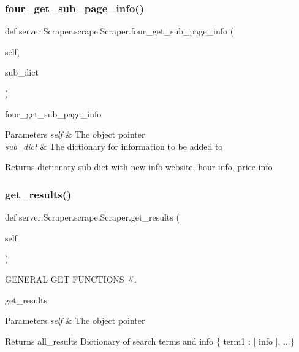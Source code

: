 \subsubsection{\texorpdfstring{four\+\_\+get\+\_\+sub\+\_\+page\+\_\+info()}{four\_get\_sub\_page\_info()}}
{\footnotesize\ttfamily def server.\+Scraper.\+scrape.\+Scraper.\+four\+\_\+get\+\_\+sub\+\_\+page\+\_\+info (\begin{DoxyParamCaption}\item[{}]{self,  }\item[{}]{sub\+\_\+dict }\end{DoxyParamCaption})}





four\+\_\+get\+\_\+sub\+\_\+page\+\_\+info 
\begin{DoxyParams}{Parameters}
{\em self} & The object pointer \\
\hline
{\em sub\+\_\+dict} & The dictionary for information to be added to \\
\hline
\end{DoxyParams}
\begin{DoxyReturn}{Returns}
dictionary sub dict with new info website, hour info, price info 
\end{DoxyReturn}
\mbox{\label{classserver_1_1_scraper_1_1scrape_1_1_scraper_a8500c13f880e66623effd042f763c0fb}} 
\subsubsection{\texorpdfstring{get\+\_\+results()}{get\_results()}}
{\footnotesize\ttfamily def server.\+Scraper.\+scrape.\+Scraper.\+get\+\_\+results (\begin{DoxyParamCaption}\item[{}]{self }\end{DoxyParamCaption})}



G\+E\+N\+E\+R\+AL G\+ET F\+U\+N\+C\+T\+I\+O\+NS \#. 

get\+\_\+results 
\begin{DoxyParams}{Parameters}
{\em self} & The object pointer \\
\hline
\end{DoxyParams}
\begin{DoxyReturn}{Returns}
all\+\_\+results Dictionary of search terms and info \{ term1 \+: \mbox{[} info \mbox{]}, ...\} 
\end{DoxyReturn}
\mbox{\label{classserver_1_1_scraper_1_1scrape_1_1_scraper_a2810e31c93ef85447245822eaea9f8ac}} 

